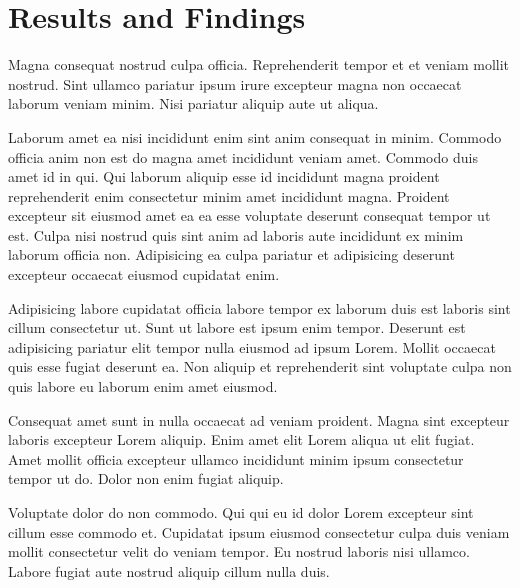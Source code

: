\section{Results and Findings}
Magna consequat nostrud culpa officia. Reprehenderit tempor et et veniam mollit nostrud. Sint ullamco pariatur ipsum irure excepteur magna non occaecat laborum veniam minim. Nisi pariatur aliquip aute ut aliqua.

Laborum amet ea nisi incididunt enim sint anim consequat in minim. Commodo officia anim non est do magna amet incididunt veniam amet. Commodo duis amet id in qui. Qui laborum aliquip esse id incididunt magna proident reprehenderit enim consectetur minim amet incididunt magna. Proident excepteur sit eiusmod amet ea ea esse voluptate deserunt consequat tempor ut est. Culpa nisi nostrud quis sint anim ad laboris aute incididunt ex minim laborum officia non. Adipisicing ea culpa pariatur et adipisicing deserunt excepteur occaecat eiusmod cupidatat enim.

Adipisicing labore cupidatat officia labore tempor ex laborum duis est laboris sint cillum consectetur ut. Sunt ut labore est ipsum enim tempor. Deserunt est adipisicing pariatur elit tempor nulla eiusmod ad ipsum Lorem. Mollit occaecat quis esse fugiat deserunt ea. Non aliquip et reprehenderit sint voluptate culpa non quis labore eu laborum enim amet eiusmod.

Consequat amet sunt in nulla occaecat ad veniam proident. Magna sint excepteur laboris excepteur Lorem aliquip. Enim amet elit Lorem aliqua ut elit fugiat. Amet mollit officia excepteur ullamco incididunt minim ipsum consectetur tempor ut do. Dolor non enim fugiat aliquip.

Voluptate dolor do non commodo. Qui qui eu id dolor Lorem excepteur sint cillum esse commodo et. Cupidatat ipsum eiusmod consectetur culpa duis veniam mollit consectetur velit do veniam tempor. Eu nostrud laboris nisi ullamco. Labore fugiat aute nostrud aliquip cillum nulla duis.